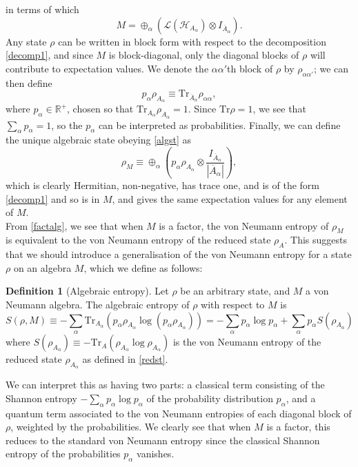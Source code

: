 \documentclass[12pt,a4paper]{report}
\numberwithin{equation}{section}
\newcommand{\ol}[1]{\overline{#1}}
\newcommand{\tr}{\text{Tr}}
\theoremstyle{definition}
\newtheorem{definition}{Definition}[section]
\theoremstyle{theorem}
\theoremstyle{theorem}
\theoremstyle{example}
\theoremstyle{definition}
\begin{document}
in terms of which 
\begin{equation}
	M=\oplus_{\alpha}(\mathcal{L}(\mathcal{H}_{A_{\alpha}})\otimes I_{\ol{A}_{\alpha}}).
\end{equation}
Any state $\rho$ can be written in block form with respect to the decomposition \ref{decomp1}, and since $M$ is block-diagonal, only the diagonal blocks of $\rho$ will contribute to expectation values. We denote the $\alpha\alpha'$th block of $\rho$ by $\rho_{\alpha\alpha'}$; we can then define
\begin{equation}\label{redst}
	p_{\alpha}\rho_{A_{\alpha}}\equiv\tr_{\ol{A}_{\alpha}}\rho_{\alpha\alpha},
\end{equation}
where $p_{\alpha}\in\mathbb{R}^{+}$, chosen so that $\tr_{A_{\alpha}}\rho_{A_{\alpha}}=1$. Since $\tr\rho=1$, we see that $\sum_{\alpha}p_{\alpha}=1$, so the $p_{\alpha}$ can be interpreted as probabilities. Finally, we can define the unique algebraic state obeying \ref{algst} as
\begin{equation}
	\rho_{M}\equiv\oplus_{\alpha}\left(p_{\alpha}\rho_{A_{\alpha}}\otimes\frac{I_{\ol{A}_{\alpha}}}{|\ol{A}_{\alpha}|}\right),
\end{equation}
which is clearly Hermitian, non-negative, has trace one, and is of the form \ref{decomp1} and so is in $M$, and gives the same expectation values for any element of $M$.\\
From \ref{factalg}, we see that when $M$ is a factor, the von Neumann entropy of $\rho_{M}$ is equivalent to the von Neumann entropy of the reduced state $\rho_{A}$. This suggests that we should introduce a generalisation of the von Neumann entropy for a state $\rho$ on an algebra $M$, which we define as follows:
\begin{definition}[Algebraic entropy]
	Let $\rho$ be an arbitrary state, and $M$ a von Neumann algebra. The algebraic entropy of $\rho$ with respect to $M$ is
	\begin{equation}
		S(\rho,M)\equiv-\sum_{\alpha}\tr_{A_{\alpha}}(p_{\alpha}\rho_{A_{\alpha}}\log(p_{\alpha}\rho_{A_{\alpha}}))=-\sum_{\alpha}p_{\alpha}\log p_{\alpha}+\sum_{\alpha}p_{\alpha}S(\rho_{A_{\alpha}})
	\end{equation}
	where $S(\rho_{A_{\alpha}})\equiv-\tr_{A}(\rho_{A_{\alpha}}\log\rho_{A_{\alpha}})$ is the von Neumann entropy of the reduced state $\rho_{A_{\alpha}}$ as defined in \ref{redst}.
\end{definition}
We can interpret this as having two parts: a classical term consisting of the Shannon entropy $-\sum_{\alpha}p_{\alpha}\log{p_{\alpha}}$ of the probability distribution $p_{\alpha}$, and a quantum term associated to the von Neumann entropies of each diagonal block of $\rho$, weighted by the probabilities. We clearly see that when $M$ is a factor, this reduces to the standard von Neumann entropy since the classical Shannon entropy of the probabilities $p_{\alpha}$ vanishes.\\
\end{document}
